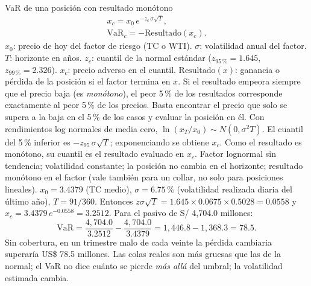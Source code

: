 \begin{ficha}{VaR de una posición con resultado monótono}
\begin{gather*}
x_c=x_0\,e^{-z_c\,\sigma\sqrt{T}},\\
\text{VaR}_c=-\text{Resultado}(x_c).
\end{gather*}
 $x_0$: precio de hoy del factor de riesgo (TC o WTI). $\sigma$: volatilidad anual del factor. $T$: horizonte en años. $z_c$: cuantil de la normal estándar ($z_{95\,\%}=1.645$, $z_{99\,\%}=2.326$). $x_c$: precio adverso en el cuantil. $\text{Resultado}(x)$: ganancia o pérdida de la posición si el factor termina en $x$.
 Si el resultado empeora siempre que el precio baja (es \emph{monótono}), el peor 5\,\% de los resultados corresponde exactamente al peor 5\,\% de los precios. Basta encontrar el precio que solo se supera a la baja en el 5\,\% de los casos y evaluar la posición en él.
 Con rendimientos log normales de media cero, $\ln(x_T/x_0)\sim N(0,\sigma^2T)$. El cuantil del 5\,\% inferior es $-z_{95}\,\sigma\sqrt{T}$; exponenciando se obtiene $x_c$. Como el resultado es monótono, su cuantil es el resultado evaluado en $x_c$.
 Factor lognormal sin tendencia; volatilidad constante; la posición no cambia en el horizonte; resultado monótono en el factor (vale también para un collar, no solo para posiciones lineales).
 $x_0=3.4379$ (TC medio), $\sigma=6.75\,\%$ (volatilidad realizada diaria del último año), $T=91/360$. Entonces $z\sigma\sqrt T=1.645\times0.0675\times0.5028=0.0558$ y $x_c=3.4379\,e^{-0.0558}=3.2512$. Para el pasivo de S/ 4,704.0 millones:
\[ \text{VaR}=\frac{4{,}704.0}{3.2512}-\frac{4{,}704.0}{3.4379}=1{,}446.8-1{,}368.3=78.5. \]
 Sin cobertura, en un trimestre malo de cada veinte la pérdida cambiaria superaría US\$ 78.5 millones.
 Las colas reales son más gruesas que las de la normal; el VaR no dice cuánto se pierde \emph{más allá} del umbral; la volatilidad estimada cambia.
\end{ficha}

